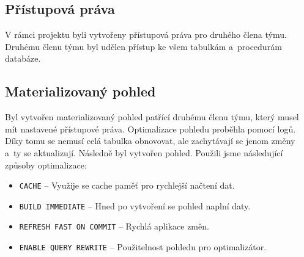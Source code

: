 \documentclass[a4paper, 12pt]{article}
\begin{document}
\subsection{Přístupová práva}
V rámci projektu byli vytvořeny přístupová práva pro druhého člena týmu. Druhému členu týmu byl udělen přístup ke všem tabulkám a~procedurám databáze. 
\subsection{Materializovaný pohled}
Byl vytvořen materializovaný pohled patřící druhému členu týmu, který musel mít nastavené přístupové práva. Optimalizace pohledu proběhla pomocí logů. Díky tomu se nemusí celá tabulka obnovovat, ale zachytávají se jenom změny a~ty se aktualizují. Následně byl vytvořen pohled. Použili jsme následující způsoby optimalizace:
\begin{itemize}
\item \texttt{CACHE} -- Využije se cache paměť pro rychlejší načtení dat.
\item \texttt{BUILD IMMEDIATE} -- Hned po vytvoření se pohled naplní daty.
\item \texttt{REFRESH FAST ON COMMIT} -- Rychlá aplikace změn.
\item \texttt{ENABLE QUERY REWRITE} -- Použitelnost pohledu pro optimalizátor.
\end{itemize}                        
                                                                                                                                                                                    
\end{document}
